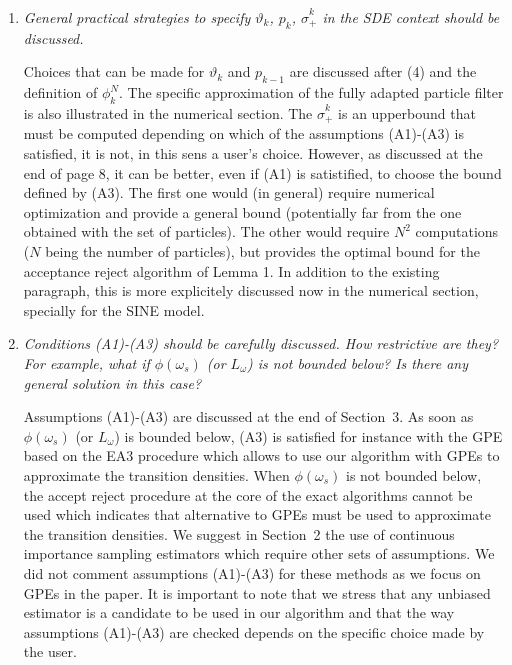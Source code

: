 \documentclass[12pt]{article}
\newcommand{\1}{\mathrm{1}}
\begin{document}
\begin{enumerate}
\item {\em General practical strategies to specify $\vartheta_k$, $p_k$, $\hat{\sigma}_+^k$ in the SDE context should be
discussed.}

\vspace{.3cm}

Choices that can be made for  $\vartheta_k$ and $p_{k-1}$ are discussed after (4) and the definition of $\phi_k^N$. The specific approximation of the fully adapted particle filter is also illustrated in the numerical section. The $\widehat{\sigma}_+^k$ is an upperbound that must be computed depending on which of the assumptions (A1)-(A3) is satisfied, it is not, in this sens a user's choice. However, as discussed at the end of page 8, it can be better, even if (A1) is satistified, to choose the bound defined by (A3). The first one would (in general) require numerical optimization and provide a general bound (potentially far from the one obtained with the set of particles). The other would require $N^2$ computations ($N$ being the number of particles), but provides the optimal bound for the acceptance reject algorithm of Lemma 1. In addition to the existing paragraph, this is more explicitely discussed now in the numerical section, specially for the SINE model.  

\item {\em Conditions (A1)-(A3) should be carefully discussed. How restrictive are they? For
example, what if $\phi(\omega_s)$ (or $L_\omega$) is not bounded below? Is there any general solution
in this case?}

\vspace{.3cm}

Assumptions (A1)-(A3) are discussed at the end of Section~3. As soon as $\phi(\omega_s)$ (or $L_\omega$) is bounded below, (A3) is satisfied  for instance with the GPE based on the  EA3 procedure  which allows to use our algorithm with GPEs to approximate the transition densities. When $\phi(\omega_s)$ is not bounded below, the accept reject procedure at the core of the exact algorithms cannot be used which indicates that alternative to GPEs must be used to approximate the transition densities. We suggest in Section~2 the use of continuous importance sampling estimators which require other sets of assumptions. We did not comment assumptions (A1)-(A3) for these methods as we focus on GPEs in the paper. It is important to note that we stress that any unbiased estimator is a candidate to be used in our algorithm and that the way assumptions (A1)-(A3) are checked depends on the specific choice made by the user.


\end{enumerate}
\end{document}
